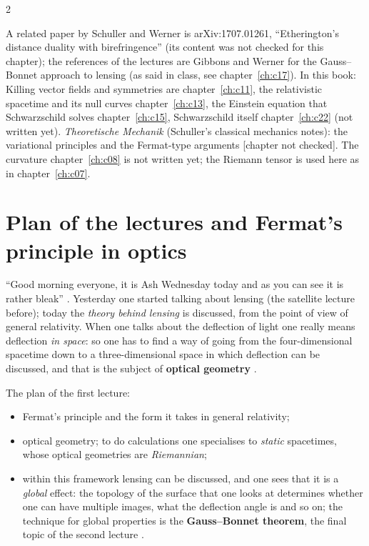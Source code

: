 \begin{paracol}{2}
\begin{reading}
A related paper by Schuller and Werner is arXiv:1707.01261, ``Etherington's distance duality with birefringence'' (its content was not checked for this chapter); the references of the lectures are Gibbons and Werner for the Gauss--Bonnet approach to lensing (as said in class, see chapter~\ref{ch:c17}). In this book: Killing vector fields and symmetries are chapter~\ref{ch:c11}, the relativistic spacetime and its null curves chapter~\ref{ch:c13}, the Einstein equation that Schwarzschild solves chapter~\ref{ch:c15}, Schwarzschild itself chapter~\ref{ch:c22} (not written yet). \emph{Theoretische Mechanik} (Schuller's classical mechanics notes): the variational principles and the Fermat-type arguments [chapter not checked]. The curvature chapter~\ref{ch:c08} is not written yet; the Riemann tensor is used here as in chapter~\ref{ch:c07}.
\end{reading}

\section{Plan of the lectures and Fermat's principle in optics}\label{sec:c16-plan}

``Good morning everyone, it is Ash Wednesday today and as you can see it is rather bleak'' . Yesterday one started talking about lensing (the satellite lecture before); today the \emph{theory behind lensing} is discussed, from the point of view of general relativity. When one talks about the deflection of light one really means deflection \emph{in space}: so one has to find a way of going from the four-dimensional spacetime down to a three-dimensional space in which deflection can be discussed, and that is the subject of \textbf{optical geometry} .

The plan of the first lecture:
\begin{itemize}
  \item Fermat's principle and the form it takes in general relativity;
  \item optical geometry; to do calculations one specialises to \emph{static} spacetimes, whose optical geometries are \emph{Riemannian};
  \item within this framework lensing can be discussed, and one sees that it is a \emph{global} effect: the topology of the surface that one looks at determines whether one can have multiple images, what the deflection angle is and so on; the technique for global properties is the \textbf{Gauss--Bonnet theorem}, the final topic of the second lecture .
\end{itemize}


\end{paracol}
